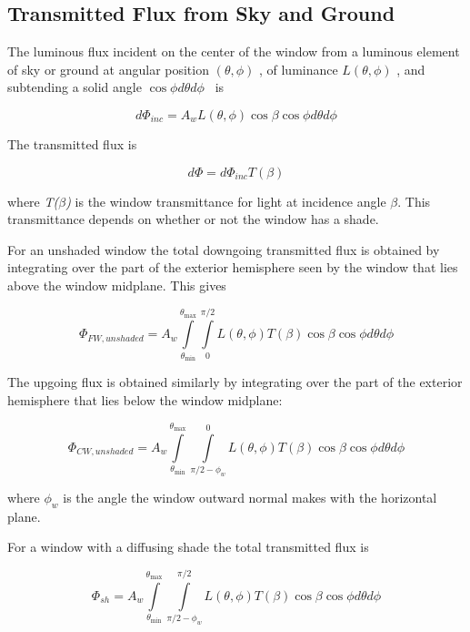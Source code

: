 \subsection{Transmitted Flux from Sky and Ground}\label{transmitted-flux-from-sky-and-ground}

The luminous flux incident on the center of the window from a luminous element of sky or ground at angular position \((\theta ,\phi )\) , of luminance \(L(\theta ,\phi )\) , and subtending a solid angle \(\cos \phi d\theta d\phi\) ~is

\begin{equation}
d{\Phi_{inc}} = {A_w}L(\theta ,\phi )\cos \beta \cos \phi d\theta d\phi
\end{equation}

The transmitted flux is

\begin{equation}
d\Phi  = d{\Phi_{inc}}T(\beta )
\end{equation}

where \emph{T($\beta$)} is the window transmittance for light at incidence angle \emph{$\beta$}. This transmittance depends on whether or not the window has a shade.

For an unshaded window the total downgoing transmitted flux is obtained by integrating over the part of the exterior hemisphere seen by the window that lies above the window midplane. This gives

\begin{equation}
{\Phi_{FW,unshaded}} = {A_w}\int\limits_{{\theta_{\min }}}^{{\theta_{\max }}} {\int\limits_0^{\pi /2} {L(\theta ,\phi )T(\beta )\cos \beta \cos \phi d\theta d\phi } }
\end{equation}

The upgoing flux is obtained similarly by integrating over the part of the exterior hemisphere that lies below the window midplane:

\begin{equation}
{\Phi_{CW,unshaded}} = {A_w}\int\limits_{{\theta_{\min }}}^{{\theta_{\max }}} {\int\limits_{\pi /2 - {\phi_w}}^0 {L(\theta ,\phi )T(\beta )\cos \beta \cos \phi d\theta d\phi } }
\end{equation}

where \({\phi_w}\) is the angle the window outward normal makes with the horizontal plane.

For a window with a diffusing shade the total transmitted flux is

\begin{equation}
{\Phi_{sh}} = {A_w}\int\limits_{{\theta_{\min }}}^{{\theta_{\max }}} {\int\limits_{\pi /2 - {\phi_w}}^{\pi /2} {L(\theta ,\phi )T(\beta )\cos \beta \cos \phi d\theta d\phi } }
\end{equation}

